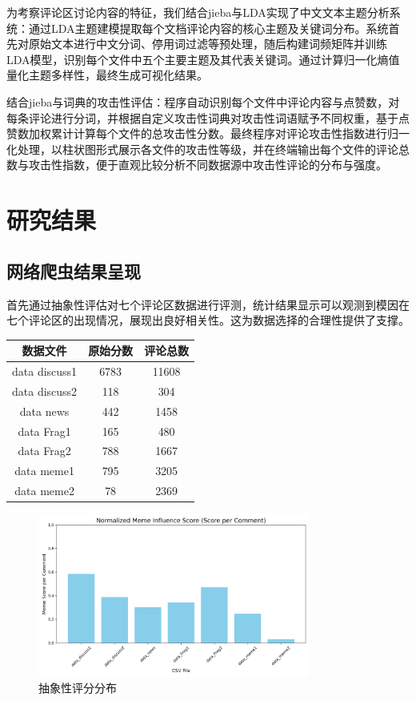 \documentclass[12pt,a4paper]{ctexart}
\begin{document}
为考察评论区讨论内容的特征，我们结合jieba与LDA实现了中文文本主题分析系统：通过LDA主题建模提取每个文档评论内容的核心主题及关键词分布。系统首先对原始文本进行中文分词、停用词过滤等预处理，随后构建词频矩阵并训练LDA模型，识别每个文件中五个主要主题及其代表关键词。通过计算归一化熵值量化主题多样性，最终生成可视化结果。

结合jieba与词典的攻击性评估：程序自动识别每个文件中评论内容与点赞数，对每条评论进行分词，并根据自定义攻击性词典对攻击性词语赋予不同权重，基于点赞数加权累计计算每个文件的总攻击性分数。最终程序对评论攻击性指数进行归一化处理，以柱状图形式展示各文件的攻击性等级，并在终端输出每个文件的评论总数与攻击性指数，便于直观比较分析不同数据源中攻击性评论的分布与强度。

\section{研究结果}%


\subsection{网络爬虫结果呈现}

首先通过抽象性评估对七个评论区数据进行评测，统计结果显示可以观测到模因在七个评论区的出现情况，展现出良好相关性。这为数据选择的合理性提供了支撑。

\begin{tabular}{|c|c|c|}
    \hline
    数据文件 & 原始分数 & 评论总数 \\
    \hline
    data discuss1 & 6783 & 11608 \\
    data discuss2 & 118 & 304 \\
    data news & 442 & 1458 \\
    data Frag1 & 165 & 480 \\
    data Frag2 & 788 & 1667 \\
    data meme1 & 795 & 3205 \\
    data meme2 & 78 & 2369 \\
    \hline
\end{tabular}

\begin{figure}[htbp]
    \centering
    \includegraphics[width=0.8\textwidth]{img/meme_score.png}
    \caption{抽象性评分分布}
\end{figure}
\newpage
\end{document}
